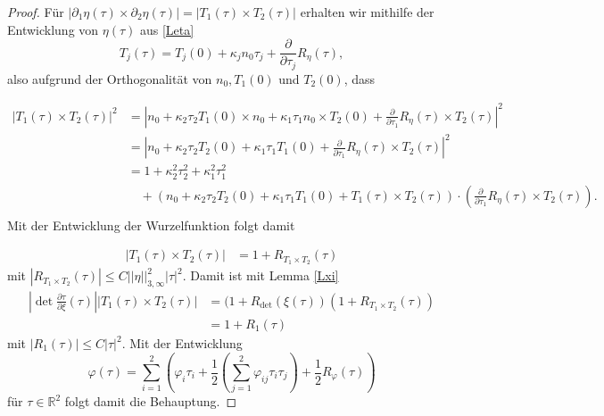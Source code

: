 \documentclass[12pt,a4paper]{scrartcl}
\numberwithin{equation}{section}
\newcommand{\R}{\mathbb{R}} %
\begin{document}
\begin{proof}
Für $|\partial_1 \eta (\tau) \times \partial_2 \eta(\tau)|= |T_1(\tau) \times T_2(\tau)|$ erhalten wir mithilfe der Entwicklung von $\eta(\tau)$ aus \ref{Leta}
\[
T_j(\tau)=T_j(0)+ \kappa_j n_0 \tau_j + \frac{\partial}{\partial \tau_j} R_\eta(\tau),
\] also aufgrund der Orthogonalität von $n_0,T_1(0)$ und $T_2(0)$, dass




\begin{align*}
|T_1(\tau) \times T_2(\tau)|^2 &= |n_0 + \kappa_2\tau_2 T_1(0) \times n_0 + \kappa_1 \tau_1 n_0 \times T_2(0) + \frac{\partial}{\partial \tau_1} R_\eta(\tau) \times T_2(\tau)|^2 \\
&= |n_0 + \kappa_2\tau_2 T_2(0) + \kappa_1 \tau_1 T_1(0) + \frac{\partial}{\partial \tau_1} R_\eta(\tau) \times T_2(\tau)|^2 \\
&= 1 + \kappa_2^2 \tau_2^2 + \kappa_1^2\tau_1^2 \\
&\quad + (n_0 + \kappa_2\tau_2 T_2(0) + \kappa_1 \tau_1 T_1(0) +T_1(\tau)\times T_2(\tau)) \cdot \left(\frac{\partial}{\partial \tau_1} R_\eta(\tau) \times T_2(\tau)\right). \\
\end{align*}
Mit der Entwicklung der Wurzelfunktion folgt damit


\begin{align*}
|T_1(\tau) \times T_2(\tau)|&= 1+ R_{T_1 \times T_2}(\tau)
\end{align*}
mit $|R_{T_1 \times T_2}(\tau)| \leq C ||\eta||^2_{3,\infty} |\tau|^2$.
Damit ist mit Lemma \ref{Lxi}
\begin{align*}
\left|\det \frac{\partial \tau}{\partial \xi}(\tau)\right||T_1(\tau) \times T_2(\tau)|
&= (1+ R_{\det}(\xi(\tau))(1+ R_{T_1 \times T_2}(\tau)) \\
&= 1+ R_1(\tau)
\end{align*}
mit $|R_1(\tau)| \leq C |\tau|^2$.
Mit der Entwicklung 
\[
\varphi(\tau) = \sum_{i=1}^2\left(\varphi_i \tau_i + \frac{1}{2}\left(\sum_{j=1}^2\varphi_{ij}\tau_i\tau_j \right) + \frac{1}{2}R_\varphi(\tau)\right)
\]
für $\tau \in \R^2$ folgt damit die Behauptung.


\end{proof}
\end{document}
